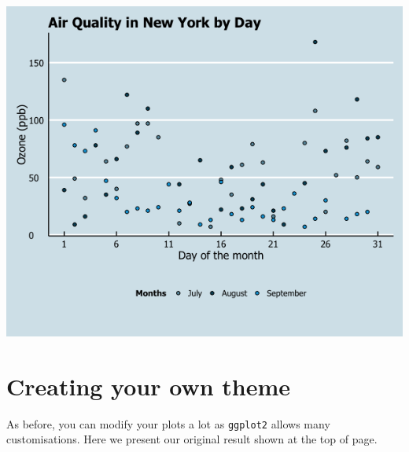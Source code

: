 \begin{center}\includegraphics[width=0.55\linewidth]{0_all_posts_pdf/scatter_14-1} \end{center}

\section{Creating your own theme}\label{creating-your-own-theme-4}

As before, you can modify your plots a lot as \texttt{ggplot2} allows
many customisations. Here we present our original result shown at the
top of page.

